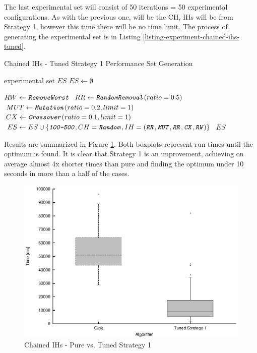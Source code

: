The last experimental set will consist of 50 iterations = 50 experimental configurations. As with the previous one,  will be the CH, IHs will be from Strategy 1, however this time there will be no time limit. The process of generating the experimental set is in Listing \ref{listing-experiment-chained-ihs-tuned}.

\begin{algorithm}
\caption{Chained IHs - Tuned Strategy 1 Performance Set Generation}
\label{listing-experiment-chained-ihs-tuned}
\begin{algorithmic}
\ENSURE experimental set $ES$
\STATE $ES \gets \emptyset$

\STATE $RW \gets \texttt{\textit{RemoveWorst}}$
\STATE $RR \gets \texttt{\textit{RandomRemoval}}(ratio = 0.5)$
\STATE $MUT \gets \texttt{\textit{Mutation}}(ratio = 0.2, limit = 1)$
\STATE $CX \gets \texttt{\textit{Crossover}}(ratio = 0.1, limit = 1)$
  \STATE $ES \gets ES \cup \{\texttt{\textit{100-500}}, CH = \texttt{\textit{Random}}, IH = (\texttt{\textit{RR}}, \texttt{\textit{MUT}}, \texttt{\textit{RR}}, \texttt{\textit{CX}}, \texttt{\textit{RW}})\}$
\ENDFOR
\RETURN $ES$
\end{algorithmic}
\end{algorithm}

Results are summarized in Figure \ref{image-experiment-chained-ihs-tuned}. Both boxplots represent run times until the optimum is found. It is clear that Strategy 1 is an improvement, achieving on average almost 4x shorter times than pure  and finding the optimum under 10 seconds in more than a half of the cases.

\begin{figure}
  \caption{Chained IHs - Pure  vs. Tuned Strategy 1}
  \label{image-experiment-chained-ihs-tuned}
  \centering
    \includegraphics[width=\textwidth]{images/experiments/chained-ihs-tuned}
\end{figure}

